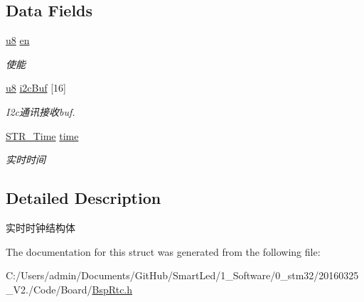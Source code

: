 \subsection*{\-Data \-Fields}
\begin{DoxyCompactItemize}
\item 
\hypertarget{struct_s_t_r___rtc_a543c992269af2f3a9483997edec0658b}{\hyperlink{group___b_s_p_gaed742c436da53c1080638ce6ef7d13de}{u8} \hyperlink{struct_s_t_r___rtc_a543c992269af2f3a9483997edec0658b}{en}}\label{struct_s_t_r___rtc_a543c992269af2f3a9483997edec0658b}

\begin{DoxyCompactList}\small\item\em 使能 \end{DoxyCompactList}\item 
\hypertarget{struct_s_t_r___rtc_a8d90e1a148c09a2b7077fcd50c8a6d82}{\hyperlink{group___b_s_p_gaed742c436da53c1080638ce6ef7d13de}{u8} \hyperlink{struct_s_t_r___rtc_a8d90e1a148c09a2b7077fcd50c8a6d82}{i2c\-Buf} \mbox{[}16\mbox{]}}\label{struct_s_t_r___rtc_a8d90e1a148c09a2b7077fcd50c8a6d82}

\begin{DoxyCompactList}\small\item\em \-I2c通讯接收buf. \end{DoxyCompactList}\item 
\hypertarget{struct_s_t_r___rtc_a91abb016510d15822fe117a4b1d839f5}{\hyperlink{struct_s_t_r___time}{\-S\-T\-R\-\_\-\-Time} \hyperlink{struct_s_t_r___rtc_a91abb016510d15822fe117a4b1d839f5}{time}}\label{struct_s_t_r___rtc_a91abb016510d15822fe117a4b1d839f5}

\begin{DoxyCompactList}\small\item\em 实时时间 \end{DoxyCompactList}\end{DoxyCompactItemize}


\subsection{\-Detailed \-Description}
实时时钟结构体 

\-The documentation for this struct was generated from the following file\-:\begin{DoxyCompactItemize}
\item 
\-C\-:/\-Users/admin/\-Documents/\-Git\-Hub/\-Smart\-Led/1\-\_\-\-Software/0\-\_\-stm32/20160325\-\_\-\-V2./\-Code/\-Board/\hyperlink{_bsp_rtc_8h}{\-Bsp\-Rtc.\-h}\end{DoxyCompactItemize}
